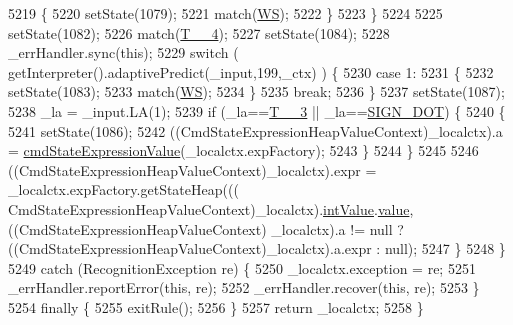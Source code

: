 \begin{DoxyCode}
5219         \{
5220         setState(1079);
5221         match(\hyperlink{classgov_1_1nasa_1_1jpf_1_1inspector_1_1server_1_1expression_1_1parser_1_1_expression_grammar_parser_ace44714ae633c7b14794cc5a24d9ebf3}{WS});
5222         \}
5223       \}
5224 
5225       setState(1082);
5226       match(\hyperlink{classgov_1_1nasa_1_1jpf_1_1inspector_1_1server_1_1expression_1_1parser_1_1_expression_grammar_parser_ae620c05745b7d42e86cfe3f8113e22d2}{T\_\_4});
5227       setState(1084);
5228       \_errHandler.sync(\textcolor{keyword}{this});
5229       \textcolor{keywordflow}{switch} ( getInterpreter().adaptivePredict(\_input,199,\_ctx) ) \{
5230       \textcolor{keywordflow}{case} 1:
5231         \{
5232         setState(1083);
5233         match(\hyperlink{classgov_1_1nasa_1_1jpf_1_1inspector_1_1server_1_1expression_1_1parser_1_1_expression_grammar_parser_ace44714ae633c7b14794cc5a24d9ebf3}{WS});
5234         \}
5235         \textcolor{keywordflow}{break};
5236       \}
5237       setState(1087);
5238       \_la = \_input.LA(1);
5239       \textcolor{keywordflow}{if} (\_la==\hyperlink{classgov_1_1nasa_1_1jpf_1_1inspector_1_1server_1_1expression_1_1parser_1_1_expression_grammar_parser_a68f9589dcc3fc777455467ff010385ea}{T\_\_3} || \_la==\hyperlink{classgov_1_1nasa_1_1jpf_1_1inspector_1_1server_1_1expression_1_1parser_1_1_expression_grammar_parser_af578d1cac8553bcf6f52608a4e9125f1}{SIGN\_DOT}) \{
5240         \{
5241         setState(1086);
5242         ((CmdStateExpressionHeapValueContext)\_localctx).a = 
      \hyperlink{classgov_1_1nasa_1_1jpf_1_1inspector_1_1server_1_1expression_1_1parser_1_1_expression_grammar_parser_a9c38888905b31e514c2e4a695b8b2be6}{cmdStateExpressionValue}(\_localctx.expFactory);
5243         \}
5244       \}
5245 
5246        ((CmdStateExpressionHeapValueContext)\_localctx).expr =  \_localctx.expFactory.getStateHeap(((
      CmdStateExpressionHeapValueContext)\_localctx).\hyperlink{classgov_1_1nasa_1_1jpf_1_1inspector_1_1server_1_1expression_1_1parser_1_1_expression_grammar_parser_a8c7e4b657a12e07efe3ea6429cb9cdcf}{intValue}.\hyperlink{classgov_1_1nasa_1_1jpf_1_1inspector_1_1server_1_1expression_1_1parser_1_1_expression_grammar_parser_1_1_int_value_context_a4c7175811f1802632486ad762d032ad5}{value}, ((CmdStateExpressionHeapValueContext)
      \_localctx).a != null ? ((CmdStateExpressionHeapValueContext)\_localctx).a.expr : null); 
5247       \}
5248     \}
5249     \textcolor{keywordflow}{catch} (RecognitionException re) \{
5250       \_localctx.exception = re;
5251       \_errHandler.reportError(\textcolor{keyword}{this}, re);
5252       \_errHandler.recover(\textcolor{keyword}{this}, re);
5253     \}
5254     \textcolor{keywordflow}{finally} \{
5255       exitRule();
5256     \}
5257     \textcolor{keywordflow}{return} \_localctx;
5258   \}
\end{DoxyCode}

